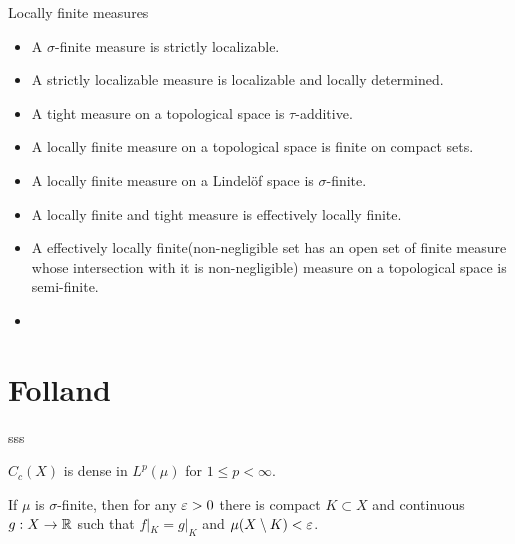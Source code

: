 \documentclass{../../large}
\begin{document}
Locally finite measures
\begin{itemize}
\item A $\sigma$-finite measure is strictly localizable.
\item A strictly localizable measure is localizable and locally determined.
\item A tight measure on a topological space is $\tau$-additive.
\item A locally finite measure on a topological space is finite on compact sets.
\item A locally finite measure on a Lindel\"of space is $\sigma$-finite.
\item A locally finite and tight measure is effectively locally finite.
\item A effectively locally finite(non-negligible set has an open set of finite measure whose intersection with it is non-negligible) measure on a topological space is semi-finite.
\item
\end{itemize}

\section*{Folland}
\begin{prb}
sss
\begin{parts}
\item $C_c(X)$ is dense in $L^p(\mu)$ for $1\le p<\infty$.
\item If $\mu$ is $\sigma$-finite, then for any $\varepsilon>0$ there is compact $K\subset X$ and continuous $g:X\to\mathbb{R}$ such that $f|_K=g|_K$ and $\mu(X\setminus K)<\varepsilon$.
\end{parts}
\end{prb}

\begin{prb}
\begin{parts}
\item
\end{parts}
\end{prb}
\end{document}
